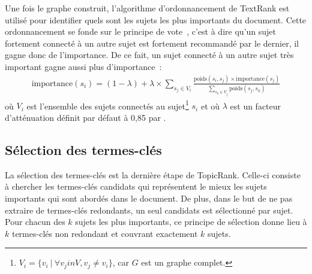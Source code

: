     Une fois le graphe construit, l'algorithme d'ordonnancement de TextRank est
    utilisé pour identifier quels sont les sujets les plus importants du
    document. Cette ordonnancement se fonde sur le principe de \og vote~\fg,
    c'est à dire qu'un sujet fortement connecté à un autre sujet est fortement
    recommandé par le dernier, il gagne donc de l'importance. De ce fait, un 
    sujet connecté à un autre sujet très important gagne aussi plus
    d'importance~:
    \begin{align}
      \text{importance}(s_i) = (1 - \lambda) + \lambda \times \sum_{s_j \in V_i} \frac{\text{poids}(s_i, s_j) \times \text{importance}(s_j)}{\sum_{s_k \in V_j} \text{poids}(s_j, s_k)} \label{math:textrank}
    \end{align}
    où $V_i$ est l'ensemble des sujets connectés au
    sujet\footnote{$V_i = \{v_i\ |\ \forall{v_j in V}, v_j \neq v_i\}$, car $G$
    est un graphe complet.} $s_i$ et où $\lambda$ est un facteur d'atténuation
    définit par défaut à 0,85 par .

  \subsection{Sélection des termes-clés}
  \label{subsec:selection_des_termes_cles}
    La sélection des termes-clés est la dernière étape de TopicRank. Celle-ci
    consiste à chercher les termes-clés candidats qui représentent le mieux les
    sujets importants qui sont abordés dans le document. De plus, dans le but de
    ne pas extraire de termes-clés redondants, un seul candidats est sélectionné
    par sujet.
    Pour chacun des $k$ sujets les plus importants, ce principe de sélection
    donne lieu à $k$ termes-clés non redondant et couvrant exactement $k$
    sujets.


